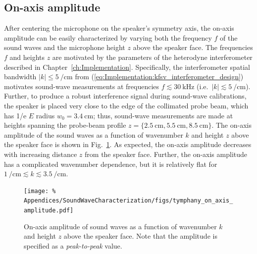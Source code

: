 \subsection{On-axis amplitude}
\label{sec:SoundWaveCharacterization:Measurements:amlitude}
After centering the microphone on the speaker's symmetry axis,
the on-axis amplitude can be easily characterized by
varying both the frequency $f$ of the sound waves and
the microphone height $z$ above the speaker face.
The frequencies $f$ and heights $z$
are motivated by the parameters of the heterodyne interferometer
described in Chapter~\ref{ch:Implementation}.
Specifically, the interferometer spatial bandwidth
$|k| \leq \SI{5}{\per\centi\meter}$
from (\ref{eq:Implementation:kfsv_interferometer_design}) motivates
sound-wave measurements at frequencies
$f \lesssim \SI{30}{\kilo\hertz}$
(i.e.\ $|k| \lesssim \SI{5}{\per\centi\meter}$).
Further, to produce a robust interference signal
during sound-wave calibrations,
the speaker is placed very close
to the edge of the collimated probe beam,
which has 1/e $E$ radius $w_0 = \SI{3.4}{\centi\meter}$;
thus, sound-wave measurements are made at heights
spanning the probe-beam profile
$z
=
\{\SI{2.5}{\centi\meter}, \SI{5.5}{\centi\meter}, \SI{8.5}{\centi\meter}\}$.
The on-axis amplitude of the sound waves as a function of
wavenumber $k$ and height $z$ above the speaker face is shown in
Fig.~\ref{fig:SoundWaveCharacterization:tymphany_on_axis_amplitude}.
As expected, the on-axis amplitude decreases with
increasing distance $z$ from the speaker face.
Further, the on-axis amplitude has a complicated wavenumber dependence, but
it is relatively flat for
$\SI{1}{\per\centi\meter} \lesssim k \lesssim \SI{3.5}{\per\centi\meter}$.

\begin{figure}
  \centering
  \texttt{[image: \%
    Appendices/SoundWaveCharacterization/figs/tymphany\_on\_axis\_amplitude.pdf]}
  \caption[On-axis amplitude of sound waves]{%
    On-axis amplitude of sound waves as a function of
    wavenumber $k$ and height $z$ above the speaker face.
    Note that the amplitude is specified
    as a \emph{peak-to-peak} value.
  }
\label{fig:SoundWaveCharacterization:tymphany_on_axis_amplitude}
\end{figure}


